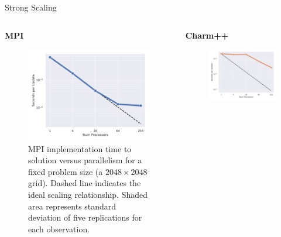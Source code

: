 \begin{block}{Strong Scaling}
\begin{columns}
  \begin{column}{0.5\textwidth}
\begin{alertblock}{\textbf{MPI}}
\begin{figure}
    \centering
    \includegraphics[width=\textwidth]{img/MPIStrong}
  	\caption{
    MPI implementation time to solution versus parallelism for a fixed problem size (a $2048\times2048$ grid).
    Dashed line indicates the ideal scaling relationship.
    Shaded area represents standard deviation of five replications for each observation.
    }
\end{figure}
\end{alertblock}
\end{column}
\begin{column}{0.5\textwidth}
\begin{alertblock}{\textbf{Charm++}}
\begin{figure}
    \centering
    \includegraphics[width=\textwidth]{img/CharmStrong}

\end{figure}
\end{alertblock}
\end{column}
\end{columns}
\end{block}
